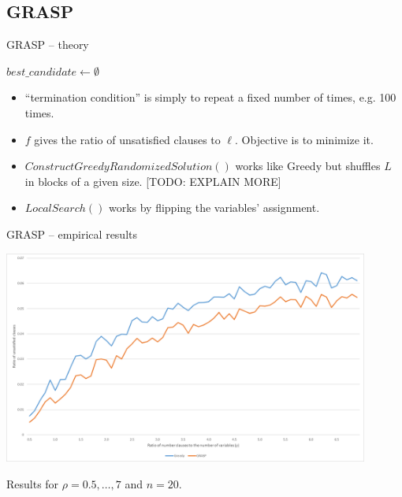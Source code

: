 \documentclass[aspectratio=169, compress, xcolor=table,xcolor=dvipsnames]{beamer}
\begin{document}
%
%
%
%

\subsection{GRASP}

\begin{frame}
{GRASP -- theory}

\begin{algorithmic}[1]\sffamily
	\State $best\_candidate\gets \emptyset$
	\EndIf
	\EndWhile
	\State{}
\end{algorithmic}

\vfill

\begin{itemize}
	\item ``termination condition'' is simply to repeat a fixed number of times, e.g. 100 times.
	\item $f$ gives the ratio of unsatisfied clauses to $\ell$. Objective is to minimize it.
	\item $ConstructGreedyRandomizedSolution()$ works like Greedy but shuffles $L$ in blocks of a given size. [TODO: EXPLAIN MORE]
	\item $LocalSearch()$ works by flipping the variables' assignment.
\end{itemize}
\end{frame}%

\begin{frame}
	{GRASP -- empirical results}

\begin{center}
	\includegraphics[width=0.9\textwidth]{img/grASP}
\end{center}

Results for $\rho=0.5,\ldots,7$ and $n=20$.
\end{frame}
\end{document}

